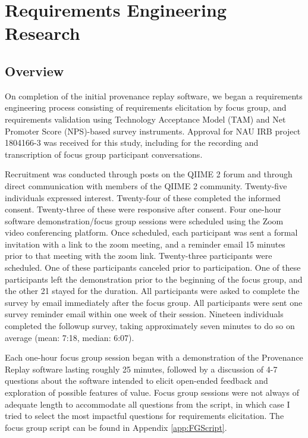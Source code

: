\chapter{Requirements Engineering Research}

\section{Overview}

On completion of the initial provenance replay software, we began a requirements
engineering process consisting of requirements elicitation by focus group, and
requirements validation using Technology Acceptance Model (TAM) \parencite{davis_perceived_1989}
and Net Promoter Score \parencite{reichheld_one_2003} (NPS)-based survey
instruments. Approval for NAU IRB project 1804166-3 was received for this study,
including for the recording and transcription of focus group participant
conversations.

Recruitment was conducted through posts on the QIIME 2 forum and through direct
communication with members of the QIIME 2 community. Twenty-five individuals
expressed interest. Twenty-four of these completed the informed consent.
Twenty-three of these were responsive after consent. Four one-hour software
demonstration/focus group sessions were scheduled using the Zoom video
conferencing platform. Once scheduled, each participant was sent a formal
invitation with a link to the zoom meeting, and a reminder email 15 minutes
prior to that meeting with the zoom link. Twenty-three participants were
scheduled. One of these participants canceled prior to participation. One of
these participants left the demonstration prior to the beginning of the focus
group, and the other 21 stayed for the duration. All participants were asked to
complete the survey by email immediately after the focus group. All participants
were sent one survey reminder email within one week of their session. Nineteen
individuals completed the followup survey, taking approximately seven minutes to
do so on average (mean: 7:18, median: 6:07).

Each one-hour focus group session began with a demonstration of the Provenance
Replay software lasting roughly 25 minutes, followed by a discussion of 4-7
questions about the software intended to elicit open-ended feedback and
exploration of possible features of value. Focus group sessions were not always
of adequate length to accommodate all questions from the script, in which case I
tried to select the most impactful questions for requirements elicitation. The
focus group script can be found in Appendix \ref{app:FGScript}.

